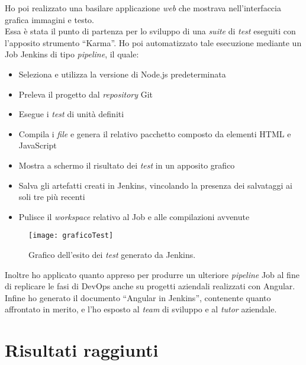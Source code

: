 Ho poi realizzato una basilare applicazione \emph{web} che mostrava nell'interfaccia grafica immagini e testo.\\
Essa è stata il punto di partenza per lo sviluppo di una \emph{suite} di \emph{test} eseguiti con l'apposito strumento “Karma”.
Ho poi automatizzato tale esecuzione mediante un Job Jenkins di tipo \emph{pipeline}, il quale: 
\begin{itemize}
    \item Seleziona e utilizza la versione di Node.js predeterminata
    \item Preleva il progetto dal \emph{repository} Git
    \item Esegue i \emph{test} di unità definiti
    \item Compila i \emph{file} e genera il relativo pacchetto composto da elementi HTML e JavaScript
    \item Mostra a schermo il risultato dei \emph{test} in un apposito grafico
    \item Salva gli artefatti creati in Jenkins, vincolando la presenza dei salvataggi ai soli tre più recenti
    \item Pulisce il \emph{workspace} relativo al Job e alle compilazioni avvenute  
\end{itemize}
\begin{figure}[htbp] 
    \centering 
    \texttt{[image: graficoTest]} 
    \caption{Grafico dell'esito dei \emph{test} generato da Jenkins.}
    \label{fig:graficoTest}
\end{figure}
Inoltre ho applicato quanto appreso per produrre un ulteriore \emph{pipeline} Job al fine di replicare le fasi di \gls{DevOps} anche su progetti aziendali realizzati con Angular.\\
Infine ho generato il documento “Angular in Jenkins”, contenente quanto affrontato in merito, e l'ho esposto al \emph{team} di sviluppo e al \emph{\emph{tutor}} aziendale. 



\section{Risultati raggiunti}%
